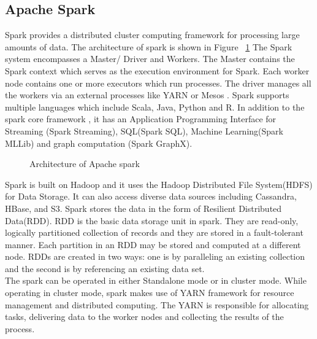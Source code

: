\documentclass[9pt,twocolumn,twoside]{../../styles/osajnl}
\begin{document}
\subsection{Apache Spark}
Spark provides a distributed cluster computing framework for processing large amounts of data. The architecture of spark is shown in Figure ~\ref{fig:spark_arch}
The  Spark system encompasses a Master/ Driver and Workers. The Master contains the Spark context which serves as the execution environment for Spark. Each worker node contains one or more executors which run processes. The driver manages all the workers via an external processes like YARN or Mesos \cite{www-apache_spark}. 
Spark supports multiple languages which include Scala, Java, Python and R. In addition to the spark core framework , it has an Application Programming Interface for Streaming (Spark Streaming), SQL(Spark SQL), Machine Learning(Spark MLLib) and graph computation (Spark GraphX). \\
\begin{figure}[htbp]
\centering
{}
\caption{Architecture of Apache spark}
\label{fig:spark_arch}
\end{figure}
Spark is built on Hadoop and it uses the Hadoop Distributed File System(HDFS) for Data Storage. It can also access diverse data sources including Cassandra, HBase, and S3. Spark stores the data in the form of Resilient Distributed Data(RDD). RDD is the basic data storage unit in spark. They are read-only, logically partitioned collection of records and they are stored in a fault-tolerant manner.  Each partition in an RDD may be stored and computed at a different node. RDDs are created in two ways: one is by paralleling an existing collection and the second is by referencing an existing data set\cite{www-RDD}.\\
The spark can be operated in either Standalone mode or in cluster mode. While operating in cluster mode, spark makes use of YARN framework for resource management and distributed computing. The YARN is responsible for allocating tasks, delivering data to the worker nodes and collecting the results of the process. 
\end{document}
